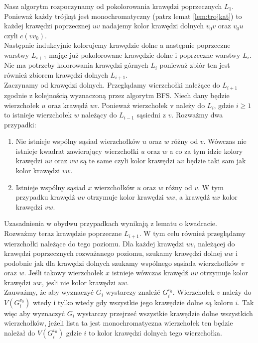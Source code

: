 \documentclass[12pt,a4paper,titlepage]{article}
\newcommand\tab[1][1cm]{\hspace*{#1}}
\begin{document}
Nasz algorytm rozpoczynamy od pokolorowania krawędzi poprzecznych $L_1$. Ponieważ każdy trójkąt jest monochromatyczny (patrz lemat \ref{lem:trojkat}) to każdej krawędzi poprzecznej $uv$ nadajemy kolor krawędzi dolnych $v_0 v$ oraz $v_0 u$ czyli $c(v v_0 )$.\\

Następnie indukcyjnie kolorujemy krawędzie dolne a następnie poprzeczne warstwy $L_{i+1}$ mając już pokolorowane krawędzie dolne i poprzeczne warstwy $L_i$. Nie ma potrzeby kolorowania krawędzi górnych $L_i$ ponieważ zbiór ten jest również zbiorem krawędzi dolnych $L_{i+1}$.\\

Zaczynamy od krawędzi dolnych. Przeglądamy wierzchołki należące do $L_{i+1}$ zgodnie z kolejnością wyznaczoną przez algorytm BFS. Niech dany będzie wierzchołek $u$ oraz krawędź $uv$. Ponieważ wierzchołek v należy do $L_i$, gdzie $i\geqslant 1$ to istnieje wierzchołek $w$ należący do $L_{i-1}$ sąsiedni z $v$. Rozważmy dwa przypadki:
\begin{enumerate}
\item Nie istnieje wspólny sąsiad wierzchołków $u$ oraz $w$ różny od $v$. Wówczas nie istnieje kwadrat zawierający wierzchołki $u$ oraz $w$ a co za tym idzie kolory krawędzi $uv$ oraz $vw$ są te same czyli kolor krawędzi $uv$ będzie taki sam jak kolor krawędzi $vw$.
\item Istnieje wspólny sąsiad $x$ wierzchołków $u$ oraz $w$ różny od $v$. W tym przypadku krawędź $uv$ otrzymuje kolor krawędzi $wx$, a krawędź $ux$ kolor krawędzi $vw$. 
\end{enumerate}
Uzasadnienia w obydwu przypadkach wynikają z lematu o kwadracie.\\
\tab[0.6cm]Rozważmy teraz krawędzie poprzeczne $L_{i+1}$. W tym celu również przeglądamy wierzchołki należące do tego poziomu. Dla każdej krawędzi $uv$, należącej do krawędzi poprzecznych rozważanego poziomu, szukamy krawędzi dolnej $uw$ i podobnie jak dla krawędzi dolnych szukamy wspólnego sąsiada wierzchołków $v$ oraz $w$. Jeśli takowy wierzchołek $x$ istnieje wówczas krawędź $uv$ otrzymuje kolor krawędzi $wx$, jesli nie kolor krawędzi $uw$.\\

Zauważmy, że aby wyznaczyć $G_i$ wystarczy znaleźć $G_i ^{v_0}$. Wierzchołek $v$ należy do $V(G_i ^{v_0})$ wtedy i tylko wtedy gdy wszystkie jego krawędzie dolne są koloru $i$. Tak więc aby wyznaczyć $G_i$ wystarczy przejrzeć wszystkie krawędzie dolne wszystkich wierzchołków, jeżeli lista ta jest monochromatyczna wierzchołek ten będzie należał do $V(G_i ^{v_0})$ gdzie $i$ to kolor krawędzi dolnych tego wierzchołka.\\
\end{document}
